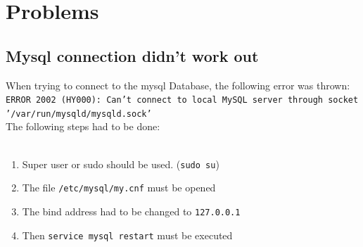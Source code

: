 \documentclass[10pt]{article}
\begin{document}
\section{Problems}
\subsection{Mysql connection didn't work out}
When trying to connect to the mysql Database, the following error was thrown:
\texttt{ERROR 2002 (HY000): Can't connect to local MySQL server through socket '/var/run/mysqld/mysqld.sock'} \\
The following steps had to be done: \\
\\ 
\begin{enumerate}
\item Super user or sudo should be used. (\texttt{sudo su}) 
\item The file \texttt{/etc/mysql/my.cnf} must be opened 
\item The bind address had to be changed to \texttt{127.0.0.1}
\item Then \texttt{service mysql restart} must be executed
\end{enumerate}
\cite{mysqlProblem1}
\end{document}
